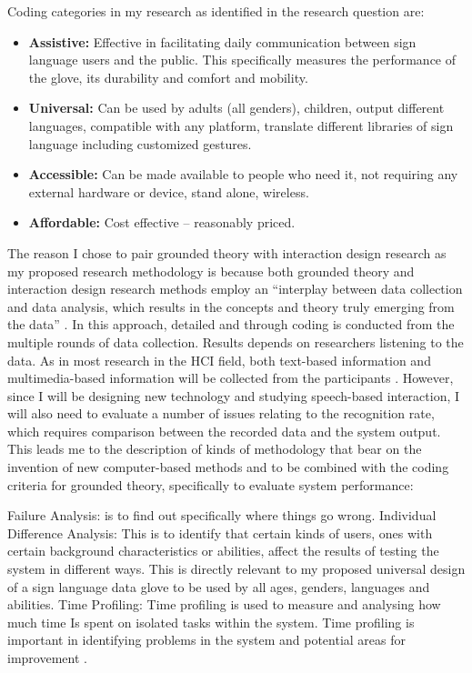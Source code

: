 Coding categories in my research as identified in the research question are:
\begin{itemize}
    \item \textbf{Assistive:} Effective in facilitating daily communication between sign language users and the public. This specifically measures the performance of the glove, its durability and comfort and mobility.
    \item \textbf{Universal:} Can be used by adults (all genders), children, output different languages, compatible with any platform, translate different libraries of sign language including customized gestures.
    \item \textbf{Accessible:} Can be made available to people who need it, not requiring any external hardware or device, stand alone, wireless.
    \item \textbf{Affordable:} Cost effective – reasonably priced.
\end{itemize}

The reason I chose to pair grounded theory with interaction design research as my proposed research methodology is because both grounded theory and interaction design research methods employ an ``interplay between data collection and data analysis, which results in the concepts and theory truly emerging from the data'' \parencite{Lazar2010}. In this approach, detailed and through coding is conducted from the multiple rounds of data collection. Results depends on researchers listening to the data. As in most research in the HCI field, both text-based information and multimedia-based information will be collected from the participants \parencite{Lazar2010}. 
However, since I will be designing new technology and studying speech-based interaction, I will also need to evaluate a number of issues relating to the recognition rate, which requires comparison between the recorded data and the system output. 
This leads me to the description of kinds of methodology that bear on the invention of new computer-based methods \parencite{Rogers2011} and to be combined with the coding criteria for grounded theory, specifically to evaluate system performance: 

Failure Analysis: is to find out specifically where things go wrong. 
Individual Difference Analysis: This is to identify that certain kinds of users, ones with certain background characteristics or abilities, affect the results of testing the system in different ways. This is directly relevant to my proposed universal design of a sign language data glove to be used by all ages, genders, languages and abilities. 
Time Profiling: Time profiling is used to measure and analysing how much time Is spent on isolated tasks within the system. Time profiling is important in identifying problems in the system and potential areas for improvement \parencite{Cox2008}. 

